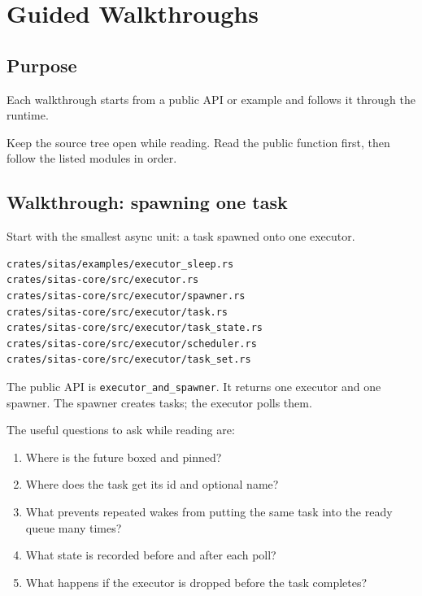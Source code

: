 \chapter{Guided Walkthroughs}
\label{chap:walkthroughs}

\section{Purpose}

Each walkthrough starts from a public API or example and follows it through the
runtime.

\begin{notabene}
Keep the source tree open while reading. Read the public function first, then
follow the listed modules in order.
\end{notabene}

\section{Walkthrough: spawning one task}

Start with the smallest async unit: a task spawned onto one executor.

\begin{lstlisting}[language={},caption={Task spawn reading path}]
crates/sitas/examples/executor_sleep.rs
crates/sitas-core/src/executor.rs
crates/sitas-core/src/executor/spawner.rs
crates/sitas-core/src/executor/task.rs
crates/sitas-core/src/executor/task_state.rs
crates/sitas-core/src/executor/scheduler.rs
crates/sitas-core/src/executor/task_set.rs
\end{lstlisting}

The public API is \texttt{executor\_and\_spawner}. It returns one executor
and one spawner. The spawner creates tasks; the executor polls them.

The useful questions to ask while reading are:

\begin{enumerate}
    \item Where is the future boxed and pinned?
    \item Where does the task get its id and optional name?
    \item What prevents repeated wakes from putting the same task into the
          ready queue many times?
    \item What state is recorded before and after each poll?
    \item What happens if the executor is dropped before the task completes?
\end{enumerate}

